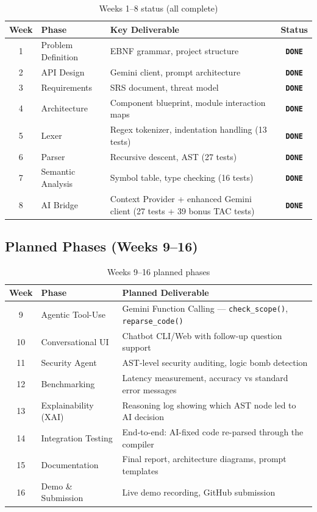 \documentclass[a4paper,11pt]{article}
\newcommand{\statusdone}[1]{\colorbox{green!20}{\textbf{\texttt{#1}}}}
\begin{document}
\begin{table}[h!]
\centering
\begin{tabularx}{\textwidth}{|c|l|X|c|}
\hline
\rowcolor{blue!10}
\textbf{Week} & \textbf{Phase} & \textbf{Key Deliverable} & \textbf{Status} \\
\hline
1 & Problem Definition & EBNF grammar, project structure & \statusdone{DONE} \\
\hline
2 & API Design & Gemini client, prompt architecture & \statusdone{DONE} \\
\hline
3 & Requirements & SRS document, threat model & \statusdone{DONE} \\
\hline
4 & Architecture & Component blueprint, module interaction maps & \statusdone{DONE} \\
\hline
5 & Lexer & Regex tokenizer, indentation handling (13 tests) & \statusdone{DONE} \\
\hline
6 & Parser & Recursive descent, AST (27 tests) & \statusdone{DONE} \\
\hline
7 & Semantic Analysis & Symbol table, type checking (16 tests) & \statusdone{DONE} \\
\hline
8 & AI Bridge & Context Provider + enhanced Gemini client (27 tests + 39 bonus TAC tests) & \statusdone{DONE} \\
\hline
\end{tabularx}
\caption{Weeks 1--8 status (all complete)}
\end{table}

\subsection{Planned Phases (Weeks 9--16)}

\begin{table}[h!]
\centering
\begin{tabularx}{\textwidth}{|c|l|X|}
\hline
\rowcolor{yellow!15}
\textbf{Week} & \textbf{Phase} & \textbf{Planned Deliverable} \\
\hline
9 & Agentic Tool-Use & Gemini Function Calling --- \texttt{check\_scope()}, \texttt{reparse\_code()} \\
\hline
10 & Conversational UI & Chatbot CLI/Web with follow-up question support \\
\hline
11 & Security Agent & AST-level security auditing, logic bomb detection \\
\hline
12 & Benchmarking & Latency measurement, accuracy vs standard error messages \\
\hline
13 & Explainability (XAI) & Reasoning log showing which AST node led to AI decision \\
\hline
14 & Integration Testing & End-to-end: AI-fixed code re-parsed through the compiler \\
\hline
15 & Documentation & Final report, architecture diagrams, prompt templates \\
\hline
16 & Demo \& Submission & Live demo recording, GitHub submission \\
\hline
\end{tabularx}
\caption{Weeks 9--16 planned phases}
\end{table}
\end{document}
